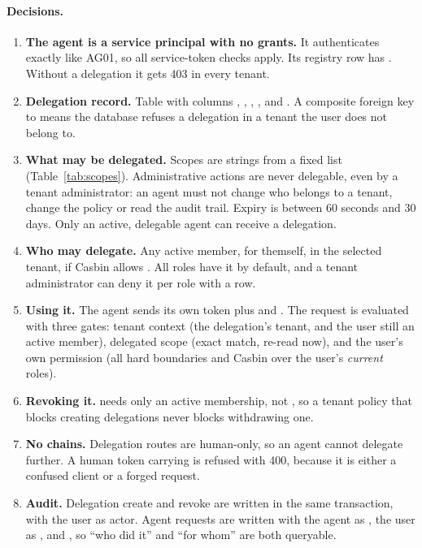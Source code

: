 \paragraph{Decisions.}
\begin{enumerate}
  \item \textbf{The agent is a service principal with no grants.} It authenticates exactly like AG01, so all service-token checks apply. Its registry row has . Without a delegation it gets 403 in every tenant.
  \item \textbf{Delegation record.} Table  with columns , , , ,  and . A composite foreign key to  means the database refuses a delegation in a tenant the user does not belong to.
  \item \textbf{What may be delegated.} Scopes are  strings from a fixed list (Table~\ref{tab:scopes}). Administrative actions are never delegable, even by a tenant administrator: an agent must not change who belongs to a tenant, change the policy or read the audit trail. Expiry is between 60 seconds and 30 days. Only an active, delegable agent can receive a delegation.
  \item \textbf{Who may delegate.} Any active member, for themself, in the selected tenant, if Casbin allows . All roles have it by default, and a tenant administrator can deny it per role with a  row.
  \item \textbf{Using it.} The agent sends its own token plus  and . The request is evaluated with three gates: tenant context (the delegation's tenant, and the user still an active member), delegated scope (exact match, re-read now), and the user's own permission (all hard boundaries and Casbin over the user's \emph{current} roles).
  \item \textbf{Revoking it.}  needs only an active membership, not , so a tenant policy that blocks creating delegations never blocks withdrawing one.
  \item \textbf{No chains.} Delegation routes are human-only, so an agent cannot delegate further. A human token carrying  is refused with 400, because it is either a confused client or a forged request.
  \item \textbf{Audit.} Delegation create and revoke are written in the same transaction, with the user as actor. Agent requests are written with the agent as , the user as , and , so ``who did it'' and ``for whom'' are both queryable.
\end{enumerate}

